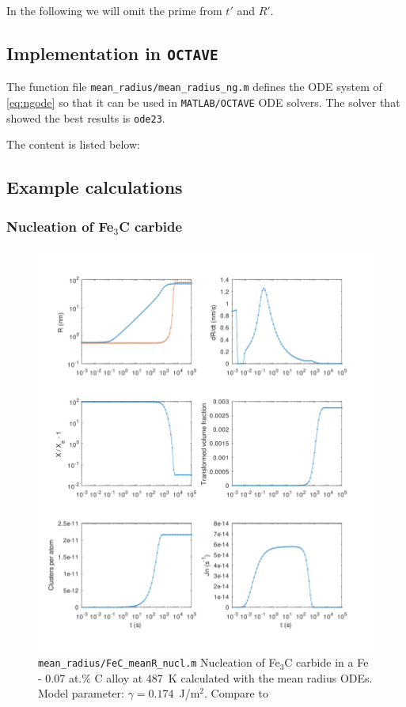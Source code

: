 \documentclass[12pt,a4paper]{article}
\begin{document}
In the following we will omit the prime from $t'$ and $R'$.

\subsection{Implementation in \texttt{OCTAVE}}

The function file \texttt{mean\_radius/mean\_radius\_ng.m} defines the ODE system of \eqref{eq:ngode} so that it can be used in \texttt{MATLAB/OCTAVE} ODE solvers. The solver that showed the best results is \texttt{ode23}.

The content is listed below: 



\pagebreak

\subsection{Example calculations}

\subsubsection{Nucleation of Fe$_3$C carbide}

\begin{figure}[h]
\centering
\includegraphics[width=14cm]{../mean_radius/FeC_meanR_nucl.pdf} 
\caption{\texttt{mean\_radius/FeC\_meanR\_nucl.m} Nucleation of Fe$_3$C carbide in a Fe - 0.07 at.\% C alloy at 487~K calculated with the mean radius ODEs. Model parameter: $\gamma = 0.174$~J/m$^2$. Compare to \citet{Perez-2003-ID509}}
\end{figure}
\end{document}
